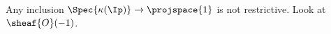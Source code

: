 \begin{nonexample}
Any inclusion $\Spec{\kappa(\Ip)} \rightarrow \projspace{1}$ is not restrictive. 
Look at $\sheaf{O}(-1)$.
\end{nonexample}